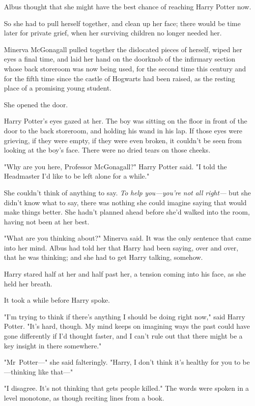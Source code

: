 Albus thought that she might have the best chance of reaching Harry Potter now.

So she had to pull herself together, and clean up her face; there would be time
later for private grief, when her surviving children no longer needed her.

Minerva McGonagall pulled together the dislocated pieces of herself, wiped her
eyes a final time, and laid her hand on the doorknob of the infirmary section
whose back storeroom was now being used, for the second time this century and
for the fifth time since the castle of Hogwarts had been raised, as the resting
place of a promising young student.

She opened the door.

Harry Potter's eyes gazed at her. The boy was sitting on the floor in front of
the door to the back storeroom, and holding his wand in his lap. If those eyes
were grieving, if they were empty, if they were even broken, it couldn't be
seen from looking at the boy's face. There were no dried tears on those cheeks.

"Why are you here, Professor McGonagall?" Harry Potter said. "I told the
Headmaster I'd like to be left alone for a while."

She couldn't think of anything to say. \emph{To help you---you're not all
right---} but she didn't know what to say, there was nothing she could imagine
saying that would make things better. She hadn't planned ahead before she'd
walked into the room, having not been at her best.

"What are you thinking about?" Minerva said. It was the only sentence that came
into her mind. Albus had told her that Harry had been saying, over and over,
that he was thinking; and she had to get Harry talking, somehow.

Harry stared half at her and half past her, a tension coming into his face, as
she held her breath.

It took a while before Harry spoke.

"I'm trying to think if there's anything I should be doing right now," said
Harry Potter. "It's hard, though. My mind keeps on imagining ways the past
could have gone differently if I'd thought faster, and I can't rule out that
there might be a key insight in there somewhere."

"Mr~Potter---" she said falteringly. "Harry, I don't think it's healthy for
you to be---thinking like that---"

"I disagree. It's not thinking that gets people killed." The words were spoken
in a level monotone, as though reciting lines from a book.


